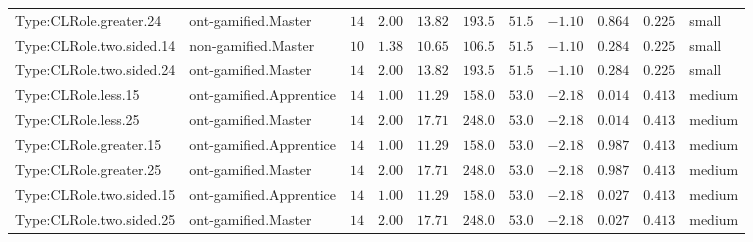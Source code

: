\documentclass[6pt,a4paper]{article}
\begin{document}
{\begin{longtable}{llrrrrrrrrl}
Type:CLRole.greater.24&ont-gamified.Master&$14$&$2.00$&$13.82$&$193.5$&$ 51.5$&$-1.10$&$0.864$&$0.225$&small\tabularnewline
Type:CLRole.two.sided.14&non-gamified.Master&$10$&$1.38$&$10.65$&$106.5$&$ 51.5$&$-1.10$&$0.284$&$0.225$&small\tabularnewline
Type:CLRole.two.sided.24&ont-gamified.Master&$14$&$2.00$&$13.82$&$193.5$&$ 51.5$&$-1.10$&$0.284$&$0.225$&small\tabularnewline
Type:CLRole.less.15&ont-gamified.Apprentice&$14$&$1.00$&$11.29$&$158.0$&$ 53.0$&$-2.18$&$0.014$&$0.413$&medium\tabularnewline
Type:CLRole.less.25&ont-gamified.Master&$14$&$2.00$&$17.71$&$248.0$&$ 53.0$&$-2.18$&$0.014$&$0.413$&medium\tabularnewline
Type:CLRole.greater.15&ont-gamified.Apprentice&$14$&$1.00$&$11.29$&$158.0$&$ 53.0$&$-2.18$&$0.987$&$0.413$&medium\tabularnewline
Type:CLRole.greater.25&ont-gamified.Master&$14$&$2.00$&$17.71$&$248.0$&$ 53.0$&$-2.18$&$0.987$&$0.413$&medium\tabularnewline
\newpage
Type:CLRole.two.sided.15&ont-gamified.Apprentice&$14$&$1.00$&$11.29$&$158.0$&$ 53.0$&$-2.18$&$0.027$&$0.413$&medium\tabularnewline
Type:CLRole.two.sided.25&ont-gamified.Master&$14$&$2.00$&$17.71$&$248.0$&$ 53.0$&$-2.18$&$0.027$&$0.413$&medium\tabularnewline
\hline
\end{longtable}}
\end{document}
